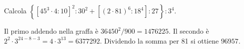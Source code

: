 
\begin{esercizio}
Calcola $\left\{\left[45^3\cdot4:10\right]^2:30^2+\left[(2\cdot81)^6:18^4\right]:27\right\}:3^4$.
\end{esercizio}

\begin{soluzione}
Il primo addendo nella graffa è $36450^2/900=1476225$. Il secondo è $2^2\cdot3^{24-8-3}=4\cdot3^{13}=6377292$. Dividendo la somma per 81 si ottiene $96957$.
\end{soluzione}
